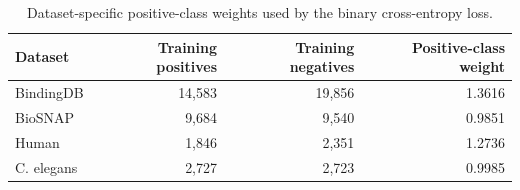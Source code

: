 \begin{table}[!htbp]
\centering
\caption{Dataset-specific positive-class weights used by the binary cross-entropy loss.}
\label{tab:si_dataset_pos_weight}
\begin{tabular}{lrrr}
\toprule
Dataset & Training positives & Training negatives & Positive-class weight \\
\midrule
BindingDB & 14,583 & 19,856 & 1.3616 \\
BioSNAP & 9,684 & 9,540 & 0.9851 \\
Human & 1,846 & 2,351 & 1.2736 \\
C. elegans & 2,727 & 2,723 & 0.9985 \\
\bottomrule
\end{tabular}
\end{table}

\clearpage
